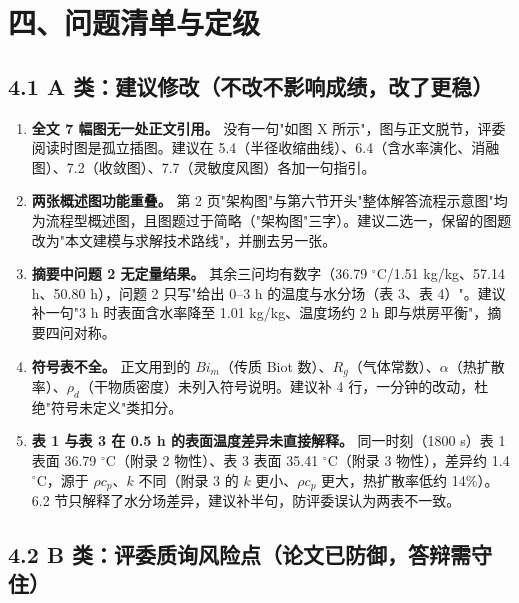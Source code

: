 \documentclass[12pt,a4paper]{ctexart}
\begin{document}
\section{四、问题清单与定级}

\subsection{4.1 A 类：建议修改（不改不影响成绩，改了更稳）}

\begin{enumerate}[label=A\arabic*.,leftmargin=2.6em]
\item \textbf{全文 7 幅图无一处正文引用。} 没有一句"如图 X 所示"，图与正文脱节，评委阅读时图是孤立插图。建议在 5.4（半径收缩曲线）、6.4（含水率演化、消融图）、7.2（收敛图）、7.7（灵敏度风图）各加一句指引。
\item \textbf{两张概述图功能重叠。} 第 2 页"架构图"与第六节开头"整体解答流程示意图"均为流程型概述图，且图题过于简略（"架构图"三字）。建议二选一，保留的图题改为"本文建模与求解技术路线"，并删去另一张。
\item \textbf{摘要中问题 2 无定量结果。} 其余三问均有数字（36.79 $^\circ$C/1.51 kg/kg、57.14 h、50.80 h），问题 2 只写"给出 0--3 h 的温度与水分场（表 3、表 4）"。建议补一句"3 h 时表面含水率降至 1.01 kg/kg、温度场约 2 h 即与烘房平衡"，摘要四问对称。
\item \textbf{符号表不全。} 正文用到的 $Bi_m$（传质 Biot 数）、$R_g$（气体常数）、$\alpha$（热扩散率）、$\rho_d$（干物质密度）未列入符号说明。建议补 4 行，一分钟的改动，杜绝"符号未定义"类扣分。
\item \textbf{表 1 与表 3 在 0.5 h 的表面温度差异未直接解释。} 同一时刻（1800 s）表 1 表面 36.79 $^\circ$C（附录 2 物性）、表 3 表面 35.41 $^\circ$C（附录 3 物性），差异约 1.4 $^\circ$C，源于 $\rho c_p$、$k$ 不同（附录 3 的 $k$ 更小、$\rho c_p$ 更大，热扩散率低约 14\%）。6.2 节只解释了水分场差异，建议补半句，防评委误认为两表不一致。
\end{enumerate}

\subsection{4.2 B 类：评委质询风险点（论文已防御，答辩需守住）}
\end{document}
